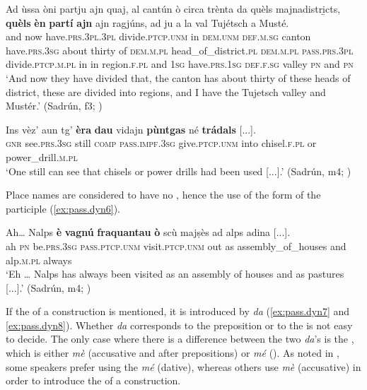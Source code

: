 \ea
\label{ex:pass.stat2}
\gll Ad ùssa òni partju ajn quaj, al cantún ò circa trènta da quèls majnadistri̱cts, \textbf{quèls} \textbf{èn} \textbf{partí} \textbf{ajn} ajn ragjúns, ad ju a la val Tujétsch a Musté.\\
and now have.\textsc{prs.3pl.3pl} divide.\textsc{ptcp.unm} in \textsc{dem.unm} \textsc{def.m.sg} canton  have.\textsc{prs.3sg} about thirty of \textsc{dem.m.pl} head\_of\_district.\textsc{pl} \textsc{dem.m.pl} \textsc{pass.prs.3pl} divide.\textsc{ptcp.m.pl} in in region.\textsc{f.pl} and \textsc{1sg} have.\textsc{prs.1sg} \textsc{def.f.sg} valley \textsc{pn} and \textsc{pn}\\
\glt `And now they have divided that, the canton has about thirty of these heads of district, these are divided into regions, and I have the Tujetsch valley and Mustér.' (Sadrún, f3; )
\z

\ea
\label{ex:pass.stat3}
\gll Ins vèz’ aun tg’ \textbf{èra} \textbf{dau} vidajn \textbf{pùntgas} né \textbf{trádals} [...].   \\
\textsc{gnr} see.\textsc{prs.3sg} still \textsc{comp} \textsc{pass.impf.3sg} give.\textsc{ptcp.unm} into chisel.\textsc{f.pl} or power\_drill.\textsc{m.pl}\\
\glt `One still can see that chisels or power drills had been used [...].' (Sadrún, m4; )
\z

Place names are considered to have no , hence the use of the  form of the participle (\ref{ex:pass.dyn6}).

\ea
\label{ex:pass.dyn6}
\gll Ah… Nalps \textbf{è} \textbf{vagnú} \textbf{fraquantau} \textbf{ò} scù majṣès ad alps adina [...].\\
ah  \textsc{pn}  be.\textsc{prs.3sg} \textsc{pass.ptcp.unm} visit.\textsc{ptcp.unm} out as assembly\_of\_houses and alp.\textsc{m.pl} always\\
\glt `Eh … Nalps has always been visited as an assembly of houses and as pastures [...].' (Sadrún, m4; )
\z

If the  of a  construction is mentioned, it is introduced by \textit{da} (\ref{ex:pass.dyn7} and \ref{ex:pass.dyn8}). Whether \textit{da} corresponds to the preposition or to the  is not easy to decide. The only case where there is a difference between the two \textit{da}'s is the , which is either \textit{mè} (accusative and after prepositions) or \textit{mé} (). As noted in , some speakers prefer using the  \textit{mé} (dative), whereas others use \textit{mè} (accusative) in order to introduce the  of a  construction.

